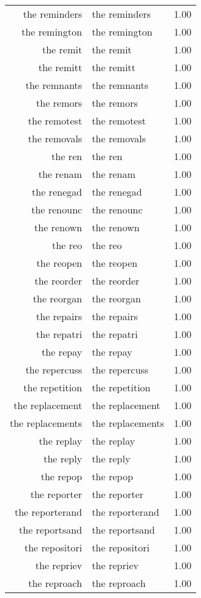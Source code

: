 \begin{table}[ht]
\begin{tabular}{rlr}
  the reminders & the reminders & 1.00 \\ 
  the remington & the remington & 1.00 \\ 
  the remit & the remit & 1.00 \\ 
  the remitt & the remitt & 1.00 \\ 
  the remnants & the remnants & 1.00 \\ 
  the remors & the remors & 1.00 \\ 
  the remotest & the remotest & 1.00 \\ 
  the removals & the removals & 1.00 \\ 
  the ren & the ren & 1.00 \\ 
  the renam & the renam & 1.00 \\ 
  the renegad & the renegad & 1.00 \\ 
  the renounc & the renounc & 1.00 \\ 
  the renown & the renown & 1.00 \\ 
  the reo & the reo & 1.00 \\ 
  the reopen & the reopen & 1.00 \\ 
  the reorder & the reorder & 1.00 \\ 
  the reorgan & the reorgan & 1.00 \\ 
  the repairs & the repairs & 1.00 \\ 
  the repatri & the repatri & 1.00 \\ 
  the repay & the repay & 1.00 \\ 
  the repercuss & the repercuss & 1.00 \\ 
  the repetition & the repetition & 1.00 \\ 
  the replacement & the replacement & 1.00 \\ 
  the replacements & the replacements & 1.00 \\ 
  the replay & the replay & 1.00 \\ 
  the reply & the reply & 1.00 \\ 
  the repop & the repop & 1.00 \\ 
  the reporter & the reporter & 1.00 \\ 
  the reporterand & the reporterand & 1.00 \\ 
  the reportsand & the reportsand & 1.00 \\ 
  the repositori & the repositori & 1.00 \\ 
  the repriev & the repriev & 1.00 \\ 
  the reproach & the reproach & 1.00 \\ 

\end{tabular}
\end{table}
